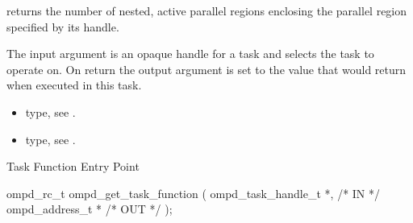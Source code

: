 \descr
{} returns the number of nested, active
parallel regions enclosing the parallel region specified by its handle.

\argdesc
The input argument  is an opaque handle for a task and selects the task to operate on.
On return the output argument  is set to the value that  would return when
executed in this task.

\crossreferences
\begin{itemize}
	\item {} type, see .
	\item {} type, see .
\end{itemize}

%
%
%


\summary
Task Function Entry Point
\format
\cspecificstart
\begin{boxedcode}
ompd\_rc\_t ompd\_get\_task\_function (
  ompd\_task\_handle\_t *,                                 /* IN */
  ompd\_address\_t *                                 /* OUT */
);
\end{boxedcode}
\cspecificend

